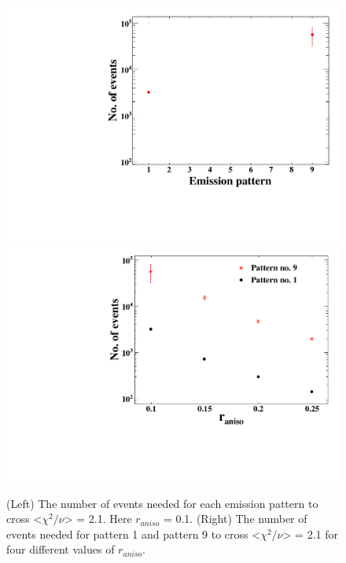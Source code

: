 \begin{figure}[h]
\centering
\includegraphics[width=0.45\linewidth]{ConvergenceVsPattern.pdf}
\hspace{0.1cm}
\includegraphics[width=0.45\linewidth]{ConvergenceVsRaniso.pdf}
\caption{(Left) The number of events needed for each emission pattern to cross <$\chi^2/\nu$> = 2.1. Here 
$r_{aniso}$ = 0.1. (Right) The number of events needed for pattern 1 and pattern 9 to cross <$\chi^2/\nu$> = 2.1 
for four different values of $r_{aniso}$.}
\label{fig:convergence}
\end{figure}


